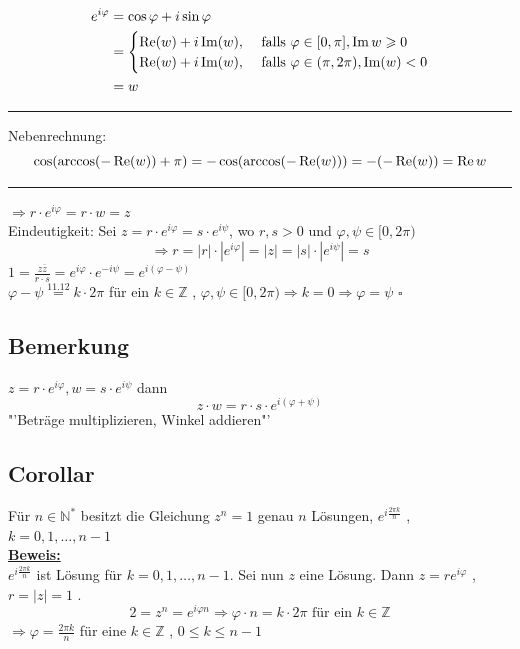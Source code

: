 \begin{align*}
	e^{i \varphi} &= \cos \varphi + i \sin \varphi \\
	&= \begin{cases}
		\operatorname{Re} (w) + i \operatorname{Im} (w), &\text{ falls }\varphi \in [0, \pi ],  \operatorname{Im} w \geqslant 0\\
		\operatorname{Re} (w) + i \operatorname{Im} (w),  &\text{ falls } \varphi \in(\pi , 2 \pi) , \operatorname{Im} (w)< 0 
	\end{cases} \\
	&= w
\end{align*}
\hrule 
\vspace{5pt} 
Nebenrechnung:
\[
	\cos ( \arccos ( - \operatorname{Re} (w)) + \pi ) = - \cos ( \arccos (- \operatorname{Re} (w))) = - (- \operatorname{Re}(w)) = \operatorname{Re} w
\]
\hrule
$\Rightarrow r \cdot  e^{i \varphi} = r \cdot w = z$ \\
Eindeutigkeit: Sei $z= r \cdot e^{i \varphi}= s \cdot e^{i \psi}$, wo $r,s >0$ und $\varphi, \psi \in [0, 2 \pi )$ 
\[
	\Rightarrow r =|r| \cdot \left| e^{i \varphi} \right|=|z| = |s| \cdot \left| e^{i \psi} \right| = s
\]
$1= \frac{z \overline{z}}{r \cdot s}= e^{i \varphi} \cdot e^{- i \psi} = e^{i(\varphi - \psi)}  $\\
 $\varphi - \psi \overset{11.12}{=} k \cdot 2 \pi $ für ein $k \in \mathds{Z}$ , $\varphi, \psi \in [0, 2 \pi ) \Rightarrow k =0 \Rightarrow \varphi = \psi$ \hfill \( \square \)

\subsection{Bemerkung} %
\label{sub:bemerkung}
$z= r \cdot e^{i \varphi}, w= s \cdot e^{i \psi}$ dann
\[
	z \cdot w = r \cdot s \cdot e^{i(\varphi + \psi)}
\]
"'Beträge multiplizieren, Winkel addieren"'

\subsection{Corollar} %
\label{sub:corollar}
Für $n \in \mathds{N}^*$ besitzt die Gleichung $z^n =1$ genau $n$ Lösungen, $e^{i \frac{2 \pi k}{n} }$ , $k = 0,1, \ldots , n-1$
\vspace{\baselineskip} \\
\underline{\textbf{Beweis:}} \\
$e^{i \frac{2 \pi  k}{n} }$ ist Lösung für $k=0, 1, \ldots , n-1$. Sei nun $z$ eine Lösung. Dann $z= r e^{i \varphi}$ , $r= |z|=1$ . 
\[
	2 = z^n = e^{i \varphi n} \Rightarrow  \varphi \cdot n = k \cdot 2 \pi \text{ für ein } k \in \mathds{Z}
\]
$\Rightarrow \varphi = \frac{2 \pi  k}{n} $ für eine $k \in \mathds{Z}$ , $0 \le k \le n-1$
\newpage

